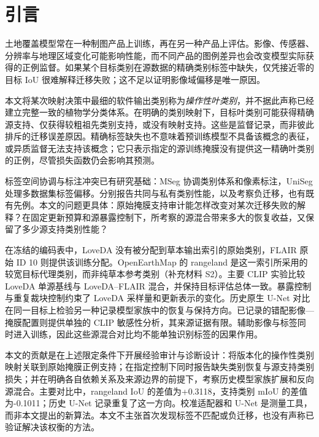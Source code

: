 \section{引言}
\label{sec:introduction}
土地覆盖模型常在一种制图产品上训练，再在另一种产品上评估。影像、传感器、分辨率与地理区域变化可能影响性能，而不同产品的图例差异也会改变模型实际获得的正例监督\citep{tuia2016domain,bruzzone2009domain,yang2017harmonization}。如果某个目标类别在源数据的精确类别标签中缺失，仅凭接近零的目标 IoU 很难解释迁移失败；这不足以证明影像域偏移是唯一原因。

本文将某次映射决策中最细的软件输出类别称为\emph{操作性叶类别}，并不据此声称已经建立完整一致的植物学分类体系。在明确的类别映射下，目标叶类别可能获得精确源支持、仅获得较粗祖先类别支持，或没有映射支持。这些是监督记录，而非彼此排斥的迁移误差原因。精确标签缺失也不意味着预训练模型不具备该概念的表征，或异质监督无法支持该概念；它只表示指定的源训练掩膜没有提供这一精确叶类别的正例，尽管损失函数仍会影响其预测。

标签空间协调与标注冲突已有研究基础：MSeg 协调类别体系和像素标注，UniSeg 处理多数据集标签偏移\citep{lambert2020mseg,kim2022uniseg}。分别报告共同与私有类别性能，以及考察负迁移，也有既有先例\citep{choe2024bus,choe2025unida,ren2026sats}。本文的问题更具体：原始掩膜支持审计能怎样改变对某次迁移失败的解释？在固定更新预算和源暴露控制下，所考察的源混合带来多大的恢复收益，又保留了多少源支持类别性能？

在冻结的编码表中，LoveDA 没有被分配到草本输出索引的原始类别，FLAIR 原始 ID 10 则提供该训练分配。OpenEarthMap 的 rangeland 是这一索引所采用的较宽目标代理类别，而非纯草本参考类别（补充材料 S2）。主要 CLIP 实验比较 LoveDA 单源基线与 LoveDA--FLAIR 混合，并保持目标评估总体一致。暴露控制与重复裁块控制约束了 LoveDA 采样量和更新表示的变化。历史原生 U-Net 对比在同一目标上检验另一种记录模型家族中的恢复与保持方向。已记录的错配影像—掩膜配置则提供单独的 CLIP 敏感性分析，其来源证据有限。辅助影像与标签同时进入训练，因此这些源混合对比均不能单独识别标签的因果作用。

本文的贡献是在上述限定条件下开展经验审计与诊断设计：将版本化的操作性类别映射关联到原始掩膜正例支持；在指定控制下同时报告缺失类别恢复与源支持类别损失；并在明确各自依赖关系及来源边界的前提下，考察历史模型家族扩展和反向源混合。主要对比中，rangeland IoU 的差值为+0.3118，支持类别 mIoU 的差值为-0.1011；历史 U-Net 记录重复了这一方向。校准适配器和 U-Net 是测量工具，而非本文提出的新算法。本文不主张首次发现标签不匹配或负迁移，也没有声称已验证解决该权衡的方法。
